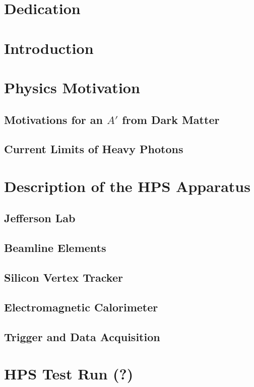 \documentclass[12pt]{report}
\begin{document}


\chapter*{Dedication}

\tableofcontents

\chapter{Introduction}

\chapter{Physics Motivation}

\section{Motivations for an $A'$ from Dark Matter}
\section{Current Limits of Heavy Photons}

\chapter{Description of the HPS Apparatus}

\section{Jefferson Lab}
\section{Beamline Elements}
\section{Silicon Vertex Tracker}
\section{Electromagnetic Calorimeter}
\section{Trigger and Data Acquisition}

\chapter{HPS Test Run (?)}
\end{document}
